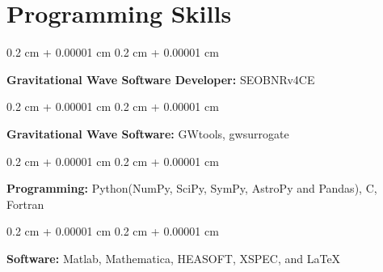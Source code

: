 \documentclass[10pt, letterpaper]{article}
\newenvironment{onecolentry}{
    \begin{adjustwidth}{
        0.2 cm + 0.00001 cm
    }{
        0.2 cm + 0.00001 cm
    }
}{
    \end{adjustwidth}
}
\begin{document}
\section{Programming Skills}

  \begin{onecolentry}
    \textbf{Gravitational Wave Software Developer:} SEOBNRv4CE
  \end{onecolentry} 

  \vspace{0.2 cm}

  \begin{onecolentry}
      \textbf{Gravitational Wave Software:} GWtools, gwsurrogate
  \end{onecolentry}

  \vspace{0.2 cm}

  \begin{onecolentry}
      \textbf{Programming:} Python(NumPy, SciPy, SymPy, AstroPy and Pandas), C, Fortran
  \end{onecolentry}

  \vspace{0.2 cm}

  \begin{onecolentry}
      \textbf{Software:} Matlab, Mathematica, HEASOFT, XSPEC, and LaTeX
  \end{onecolentry}
    
\end{document}
